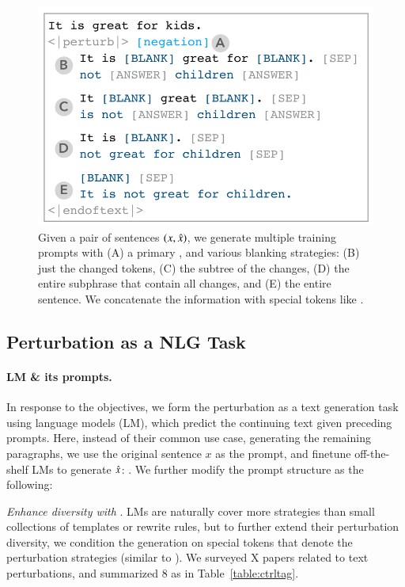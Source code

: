 \begin{figure}[t]
\centering
\includegraphics[width=1\columnwidth]{figures/blank}
\vspace{-15pt}
\caption{Given a pair of sentences $(x, \hat{x})$, we generate multiple training prompts with (A) a primary \tagstr, and various blanking strategies: (B) just the changed tokens, (C) the subtree of the changes, (D) the entire subphrase that contain all changes, and (E) the entire sentence.
We concatenate the information with special tokens like \perturbtoken.
}
\vspace{-10pt}
\label{fig:blank}
\end{figure}
 
\subsection{Perturbation as a NLG Task}

\paragraph{LM \& its prompts.}
In response to the objectives, we form the perturbation as a text generation task using language models (LM), which predict the continuing text given preceding prompts.
Here, instead of their common use case, \ie generating the remaining paragraphs, we use the original sentence $x$ as the prompt, and finetune off-the-shelf LMs to generate $\hat{x}$: .
We further modify the prompt structure as the following:

\emph{Enhance diversity with \tagstrs}.
LMs are naturally cover more strategies than small collections of templates or rewrite rules, but to further extend their perturbation diversity, we condition the generation on special tokens that denote the perturbation strategies (similar to \citet{raffel2019exploring, Dathathri2020Plug}).
We surveyed X papers related to text perturbations, and summarized 8 \tagstrs as in Table~\ref{table:ctrltag}.

